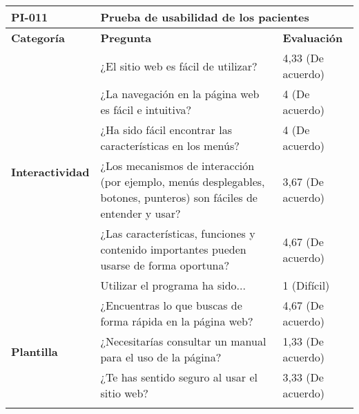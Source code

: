 \begin{table}[htpb]
\centering
\begin{tabularx}{\textwidth}{|l|X|l|}
\hline
\textbf{PI-011}                           & \multicolumn{2}{l|}{\textbf{Prueba de usabilidad de los pacientes}}                                                                       \\ \hline
\textbf{Categoría}                        & \textbf{Pregunta}                                                                                                   & \textbf{Evaluación} \\ \hline
\multirow{6}{*}{\textbf{Interactividad}}  & ¿El sitio web es fácil de utilizar?                                                                                 & 4,33 (De acuerdo)   \\ \cline{2-3} 
                                          & ¿La navegación en la página web es fácil e intuitiva?                                                               & 4 (De acuerdo)      \\ \cline{2-3} 
                                          & ¿Ha sido fácil encontrar las características en los menús?                                                          & 4 (De acuerdo)      \\ \cline{2-3} 
                                          & ¿Los mecanismos de interacción (por ejemplo, menús desplegables, botones, punteros) son fáciles de entender y usar? & 3,67 (De acuerdo)   \\ \cline{2-3} 
                                          & ¿Las características, funciones y contenido importantes pueden usarse de forma oportuna?                            & 4,67 (De acuerdo)   \\ \cline{2-3} 
                                          & Utilizar el programa ha sido...                                                                                     & 1 (Difícil)         \\ \hline
\multirow{4}{*}{\textbf{Plantilla}}       & ¿Encuentras lo que buscas de forma rápida en la página web?                                                         & 4,67 (De acuerdo)   \\ \cline{2-3} 
                                          & ¿Necesitarías consultar un manual para el uso de la página?                                                         & 1,33 (De acuerdo)   \\ \cline{2-3} 
                                          & ¿Te has sentido seguro al usar el sitio web?                                                                        & 3,33 (De acuerdo)   \\ \cline{2-3} 

\end{tabularx}
\end{table}
